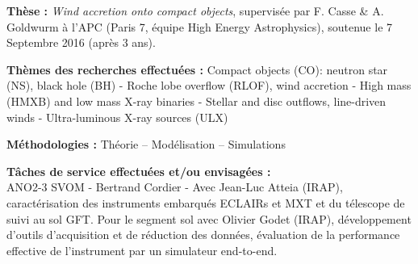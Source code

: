 \documentclass[11pt]{article}
\begin{document}
\vspace{-0.2cm}
{\bf Th\`ese :} \textit{Wind accretion onto compact objects}, supervis\'ee par F. Casse \& A. Goldwurm \`{a} l'APC (Paris 7, \'{e}quipe High Energy Astrophysics), soutenue le 7 Septembre 2016 (apr\`es 3 ans). 



\vspace{0.2cm}
{\bf Th\`emes des recherches effectu\'ees : } Compact objects (CO): neutron star (NS), black hole (BH) - Roche lobe overflow (RLOF), wind accretion - High mass (HMXB) and low mass X-ray binaries - Stellar and disc outflows, line-driven winds - Ultra-luminous X-ray sources (ULX)


\vspace{0.3cm}


{\bf M\'ethodologies :}  
Th\'eorie --  Mod\'elisation -- Simulations

\vspace{0.3cm}

{\bf T\^{a}ches de service effectu\'ees et/ou envisag\'ees :}\\
ANO2-3 SVOM - Bertrand Cordier - Avec Jean-Luc Atteia (IRAP), caract\'{e}risation des instruments embarqu\'{e}s ECLAIRs et MXT et du t\'{e}lescope de suivi au sol GFT. Pour le segment sol avec Olivier Godet (IRAP), d\'{e}veloppement d'outils d'acquisition et de r\'{e}duction des donn\'{e}es, \'{e}valuation de la performance effective de l'instrument par un simulateur end-to-end.\\
\end{document}
